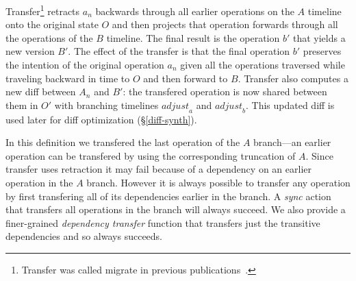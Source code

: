 \documentclass[english,submission]{programming}
\theoremstyle{definition}
\begin{document}
Transfer\footnote{Transfer was called migrate in previous publications~\cite{edwards21, edwards22}.} retracts $a_n$ backwards through all earlier operations on the $A$ timeline onto the original state $O$ and then projects that operation forwards through all the operations of the $B$ timeline. The final result is the operation $b'$ that yields a new version $B'$. The effect of the transfer is that the final operation $b'$ preserves the intention of the original operation $a_n$ given all the operations traversed while traveling backward in time to $O$ and then forward to $B$. Transfer also computes a new diff between $A_n$ and $B'$: the transfered operation is now shared between them in $O'$ with branching timelines $\mathit{adjust}_a$ and $\mathit{adjust}_b$. This updated diff is used later for diff optimization (\S\ref{diff-synth}).

In this definition we transfered the last operation of the $A$ branch---an earlier operation can be transfered by using the corresponding truncation of $A$.
Since transfer uses retraction it may fail because of a dependency on an earlier operation in the $A$ branch. However it is always possible to transfer any operation by first transfering all of its dependencies earlier in the branch. A \textit{sync} action that transfers all operations in the branch will always succeed. We also provide a finer-grained \textit{dependency transfer} function that transfers just the transitive dependencies and so always succeeds.
\end{document}
